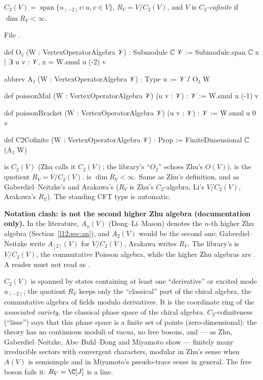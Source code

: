 \begin{definition}\label{l12:def:c2}
$C_2(V) = \operatorname{span}\{u_{(-2)}v : u,v\in V\}$, $R_V = V/C_2(V)$, and $V$ is \emph{$C_2$-cofinite} if
$\dim R_V<\infty$.
\end{definition}
\noindent File .
\begin{leancode}
def O₂ (W : VertexOperatorAlgebra 𝒱) : Submodule ℂ 𝒱 :=
  Submodule.span ℂ {x | ∃ u v : 𝒱, x = W.smul u (-2) v}

abbrev A₂ (W : VertexOperatorAlgebra 𝒱) : Type u := 𝒱 ⧸ O₂ W

def poissonMul (W : VertexOperatorAlgebra 𝒱) (u v : 𝒱) : 𝒱 := W.smul u (-1) v

def poissonBracket (W : VertexOperatorAlgebra 𝒱) (u v : 𝒱) : 𝒱 := W.smul u 0 v

def C2Cofinite (W : VertexOperatorAlgebra 𝒱) : Prop := FiniteDimensional ℂ (A₂ W)
\end{leancode}

\begin{dictionary}
 is $C_2(V)$ (Zhu calls it $C_2(V)$; the library's ``$O_2$'' echoes Zhu's $O(V)$).  is the
quotient $R_V = V/C_2(V)$.  is $\dim R_V<\infty$. Same as Zhu's definition, and as
Gaberdiel--Neitzke's and Arakawa's ($R_V$ is Zhu's $C_2$-algebra, Li's $V/C_2(V)$, Arakawa's
$R_V$). The standing CFT type is automatic.
\end{dictionary}

\begin{warning}
\textbf{Notation clash:  is not the second higher Zhu algebra (documentation only).} In the literature, $A_n(V)$
(Dong--Li--Mason) denotes the $n$-th higher Zhu algebra (Section~\ref{l12:sec:an}), and $A_2(V)$ would be the
second one; Gaberdiel--Neitzke write $A_{[2]}(V)$ for $V/C_2(V)$, Arakawa writes $R_V$. The library's
 is $V/C_2(V)$, the commutative Poisson algebra, while the higher Zhu algebras are . A
reader must not read  as .
\end{warning}

\begin{physics}
$C_2(V)$ is spanned by states containing at least one ``derivative'' or excited mode $u_{(-2)}$; the quotient
$R_V$ keeps only the ``classical'' part of the chiral algebra, the commutative algebra of fields modulo
derivatives. It is the coordinate ring of the \emph{associated variety}, the classical phase space of the chiral
algebra. $C_2$-cofiniteness (``lisse'') says that this phase space is a finite set of points (zero-dimensional):
the theory has no continuous moduli of vacua, no free bosons, and --- as Zhu, Gaberdiel--Neitzke, Abe--Buhl--Dong
and Miyamoto show --- finitely many irreducible sectors with convergent characters, modular in Zhu's sense when $A(V)$ is
semisimple and in Miyamoto's pseudo-trace sense in general. The free boson
fails it: $R_V = \C[J]$ is a line.
\end{physics}

